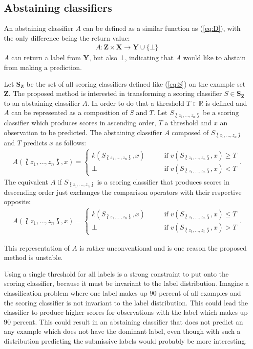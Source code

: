 \documentclass[twoside,11pt]{article}
\def\ds{\Lbag z_1,\dots,z_n \Rbag}
\def\Z{\textbf{Z}}
\def\S{\textbf{S}_{\Z}}
\begin{document}
\subsection{Abstaining classifiers}

An abstaining classifier $A$ can be defined as a similar
function as (\ref{eq:D}), with the only difference being
the return value:
\begin{align*}
  A: \textbf{Z} \times \textbf{X} \rightarrow
      \textbf{Y} \cup \{\bot\}
\end{align*}
$A$ can return a label from $\textbf{Y}$, but also $\bot$,
indicating that $A$ would like to abstain from making a
prediction.

Let $\S$ be the set of all scoring classifiers defined like
(\ref{eq:S}) on the example set $\Z$.
The proposed method is interested in transforming a
scoring classifier $S \in \S$ to an abstaining classifier
$A$.
In order to do that a threshold $T \in \mathbb{R}$ is
defined and $A$ can be represented as a composition of $S$
and $T$.
Let $S_{\ds}$ be a scoring classifier which produces scores
in ascending order, $T$ a threshold and $x$ an observation
to be predicted.
The abstaining classifier $A$ composed of $S_{\ds}$ and $T$
predicts $x$ as follows:
\begin{align}
  \label{eq:A}
  A(\ds, x) =
    \begin{cases}
      k(S_{\ds}, x) &\qquad \text{if }v(S_{\ds}, x)\geq T\\
      \bot &\qquad \text{if } v(S_{\ds}, x) < T
    \end{cases}.
\end{align}
The equivalent $A$ if $S_{\ds}$ is a scoring classifier
that produces scores in descending order just exchanges the
comparison operators with their respective opposite:
\begin{align}
  \label{eq:A2}
  A(\ds, x) =
    \begin{cases}
      k(S_{\ds}, x) &\qquad \text{if }v(S_{\ds}, x)\leq T\\
      \bot &\qquad \text{if } v(S_{\ds}, x) > T
    \end{cases}.
\end{align}

This representation of $A$ is rather unconventional and
is one reason the proposed method is unstable.

Using a single threshold for all labels is a strong
constraint to put onto the scoring classifier, because it
must be invariant to the label distribution.
Imagine a classification problem where one label makes up
90 percent of all examples and the scoring classifier is
not invariant to the label distribution.
This could lead the classifier to produce higher scores for
observations with the label which makes up 90 percent.
This could result in an abstaining classifier that does not
predict an any example which does not have the dominant
label, even though with such a distribution predicting
the submissive labels would probably be more interesting.
\end{document}
